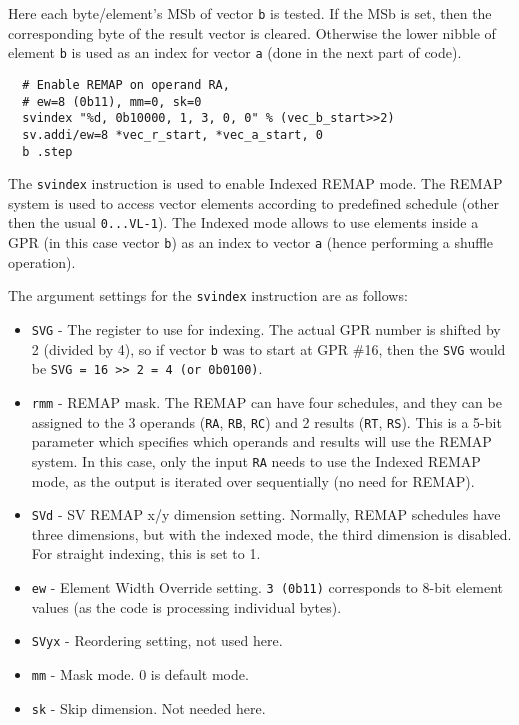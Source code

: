 Here each byte/element's \acrshort{MSb} of vector \texttt{b} is tested.
If the \acrshort{MSb} is set, then the corresponding byte of the result vector
is cleared. Otherwise the lower nibble of element \texttt{b} is used as an
index for vector \texttt{a} (done in the next part of code).

\begin{verbatim}
  # Enable REMAP on operand RA,
  # ew=8 (0b11), mm=0, sk=0
  svindex "%d, 0b10000, 1, 3, 0, 0" % (vec_b_start>>2)
  sv.addi/ew=8 *vec_r_start, *vec_a_start, 0
  b .step
\end{verbatim}

The \texttt{svindex} instruction is used to enable Indexed REMAP mode.
The REMAP system is used to access vector elements according to predefined
schedule (other then the usual \texttt{0...VL-1}). The Indexed mode allows
to use elements inside a \acrshort{GPR} (in this case vector \texttt{b})
as an index to vector \texttt{a} (hence performing a shuffle operation).

The argument settings for the \texttt{svindex} instruction are as follows:

\begin{itemize}
  \item \texttt{SVG} - The register to use for indexing. The actual
  \acrshort{GPR} number is shifted by 2 (divided by 4), so if vector \texttt{b}
  was to start at \acrshort{GPR} \#16, then the \texttt{SVG} would be
  \texttt{SVG = 16 >> 2 = 4 (or 0b0100)}.
  \item \texttt{rmm} - REMAP mask. The REMAP can have four schedules, and they
  can be assigned to the 3 operands (\texttt{RA}, \texttt{RB}, \texttt{RC})
  and 2 results (\texttt{RT}, \texttt{RS}). This is a 5-bit parameter which
  specifies which operands and results will use the REMAP system. In this case,
  only the input \texttt{RA} needs to use the Indexed REMAP mode, as the output
  is iterated over sequentially (no need for REMAP).
  \item \texttt{SVd} - \acrshort{SV} REMAP x/y dimension setting. Normally,
  REMAP schedules have three dimensions, but with the indexed mode, the third
  dimension is disabled. For straight indexing, this is set to 1.
  \item \texttt{ew} - Element Width Override setting. \texttt{3 (0b11)}
  corresponds to 8-bit element values
  (as the code is processing individual bytes).
  \item \texttt{SVyx} - Reordering setting, not used here.
  \item \texttt{mm} - Mask mode. 0 is default mode.
  \item \texttt{sk} - Skip dimension. Not needed here.
\end{itemize}

